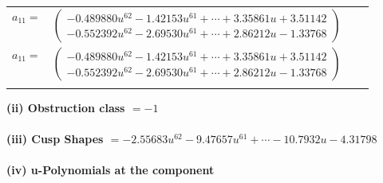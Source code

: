 \documentclass[1p]{elsarticle_modified}
\theoremstyle{definition}
\begin{document}
\begin{tabular}{m{7pt} m{180pt} m{7pt} m{180pt} }
\flushright $a_{11}=$&$\begin{pmatrix}-0.489880 u^{62}-1.42153 u^{61}+\cdots+3.35861 u+3.51142\\-0.552392 u^{62}-2.69530 u^{61}+\cdots+2.86212 u-1.33768\end{pmatrix}$\\ \flushright $a_{11}=$&$\begin{pmatrix}-0.489880 u^{62}-1.42153 u^{61}+\cdots+3.35861 u+3.51142\\-0.552392 u^{62}-2.69530 u^{61}+\cdots+2.86212 u-1.33768\end{pmatrix}$\\&\end{tabular}
\flushleft \textbf{(ii) Obstruction class $= -1$}\\~\\
\flushleft \textbf{(iii) Cusp Shapes $= -2.55683 u^{62}-9.47657 u^{61}+\cdots-10.7932 u-4.31798$}\\~\\
\newpage\renewcommand{\arraystretch}{1}
\flushleft \textbf{(iv) u-Polynomials at the component}\newline \\
\end{document}
